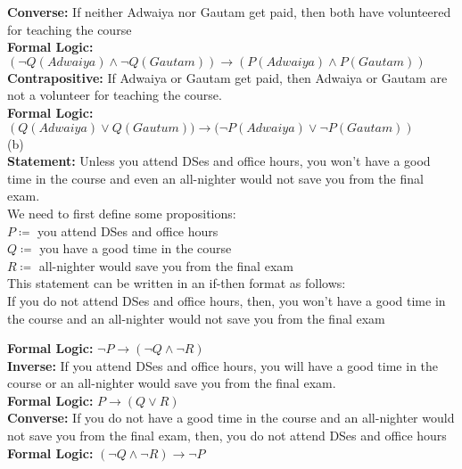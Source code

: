 \documentclass[a4paper]{article}
\begin{document}
\begin{enumerate}
\textbf{Converse:} If neither Adwaiya nor Gautam get paid, then both have volunteered for teaching the course\\
\textbf{Formal Logic:} $\left(\neg Q(Adwaiya) \land \neg Q(Gautam)\right) \rightarrow \left(P(Adwaiya) \land P(Gautam)\right)$\\

\textbf{Contrapositive:} If Adwaiya or Gautam get paid, then Adwaiya or Gautam are not a volunteer for teaching the course.\\
\textbf{Formal Logic:} $\left(Q(Adwaiya) \lor Q(Gautum)) \rightarrow (\neg P(Adwaiya) \lor \neg P(Gautam)\right)$\\

(b)\\
\textbf{Statement:} Unless you attend DSes and office hours, you won’t have a good time in the course and even an all-nighter would not save you from the final exam.\\

We need to first define some propositions:\\ 
$P \coloneqq $ you attend DSes and office hours \\
$Q \coloneqq $ you have a good time in the course \\
$R \coloneqq $ all-nighter would save you from the final exam \\ 


This statement can be written in an if-then format as follows: \\
If you do not attend DSes and office hours, then, you won't have a good time in the course and an all-nighter would not save you from the final exam

\textbf{Formal Logic:} $\neg P \rightarrow \left(\neg Q \land \neg R\right)$\\


\textbf{Inverse:} If you attend DSes and office hours, you will have a good time in the course or an all-nighter would save you from the final exam.\\
\textbf{Formal Logic:} $P \rightarrow \left(Q \lor R\right)$\\


\textbf{Converse:} If you do not have a good time in the course and an all-nighter would not save you from the final exam, then, you do not attend DSes and office hours\\
\textbf{Formal Logic:} $\left(\neg Q \land \neg R\right) \rightarrow \neg P$\\


\end{enumerate}
\end{document}
